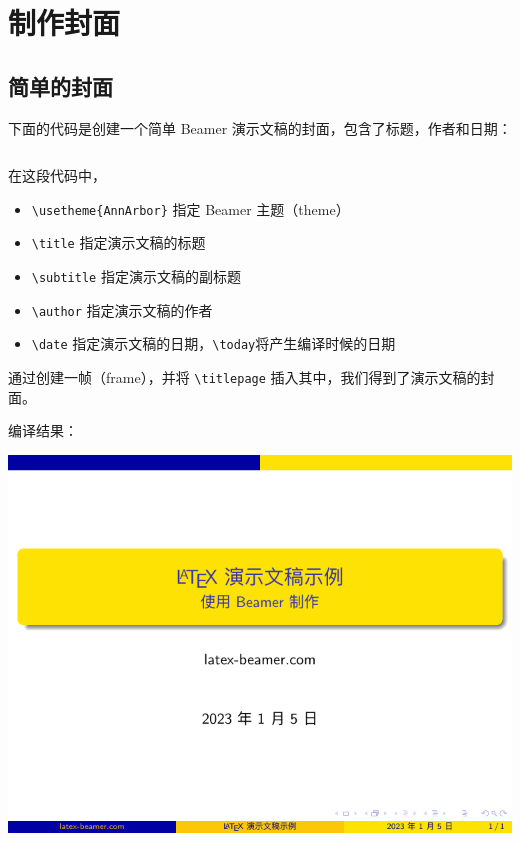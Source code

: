 \section{制作封面}

\subsection{简单的封面}

下面的代码是创建一个简单 Beamer 演示文稿的封面，包含了标题，作者和日期：

\inputminted[linenos=true]{latex}{examples/beamer/title-page-simple.tex}

在这段代码中，
\begin{itemize}
  \item \verb|\usetheme{AnnArbor}| 指定 Beamer 主题（theme）
  \item \verb|\title| 指定演示文稿的标题
  \item \verb|\subtitle| 指定演示文稿的副标题
  \item \verb|\author| 指定演示文稿的作者
  \item \verb|\date| 指定演示文稿的日期，\verb|\today|将产生编译时候的日期
\end{itemize}

\begin{remark*}
通过创建一帧（frame），并将 \verb|\titlepage| 插入其中，我们得到了演示文稿的封面。
\end{remark*}

编译结果：

\includegraphics{examples/beamer/title-page-simple.pdf}

